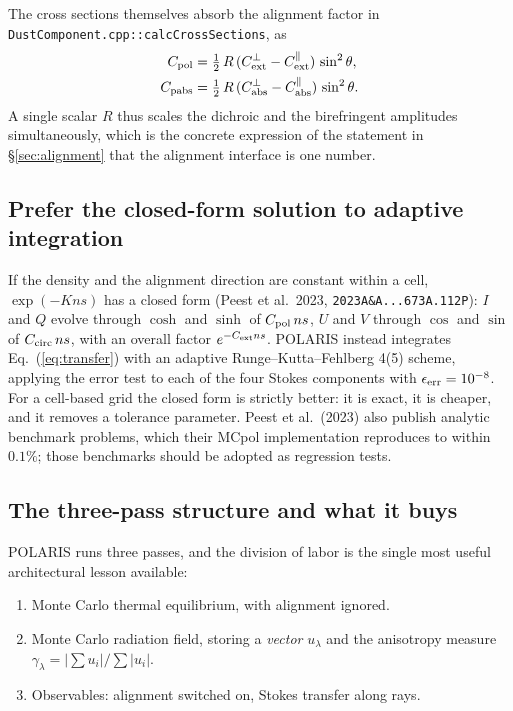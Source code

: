 \documentclass{my_memo}
\newcommand{\code}[1]{\texttt{#1}}
\newcommand{\Cext}{\ensuremath{C_{\rm ext}}}
\newcommand{\Cabs}{\ensuremath{C_{\rm abs}}}
\newcommand{\Cpol}{\ensuremath{C_{\rm pol}}}
\newcommand{\Ccirc}{\ensuremath{C_{\rm circ}}}
\begin{document}
The cross sections themselves absorb the alignment factor in
\code{DustComponent.cpp::calcCrossSections}, as
\begin{align}
  \Cpol  &= \tfrac12\,R\,(\Cext^{\perp} - \Cext^{\parallel})\,\sin^2\theta,
    \label{eq:cpolR} \\
  C_{\rm pabs} &= \tfrac12\,R\,(\Cabs^{\perp} - \Cabs^{\parallel})\,\sin^2\theta.
    \label{eq:cpabsR}
\end{align}
A single scalar $R$ thus scales the dichroic and the birefringent
amplitudes simultaneously, which is the concrete expression of the
statement in \S\ref{sec:alignment} that the alignment interface is one
number.

\subsection{Prefer the closed-form solution to adaptive integration}

If the density and the alignment direction are constant within a cell,
$\exp(-Kns)$ has a closed form (Peest et al.\ 2023,
\code{2023A\&A...673A.112P}): $I$ and $Q$ evolve through
$\cosh$ and $\sinh$ of $\Cpol\,n s$, $U$ and $V$ through $\cos$ and
$\sin$ of $\Ccirc\,n s$, with an overall factor $e^{-\Cext n s}$. POLARIS
instead integrates Eq.~(\ref{eq:transfer}) with an adaptive
Runge--Kutta--Fehlberg 4(5) scheme, applying the error test to each of
the four Stokes components with $\epsilon_{\rm err} = 10^{-8}$. For a
cell-based grid the closed form is strictly better: it is exact, it is
cheaper, and it removes a tolerance parameter. Peest et al.\ (2023) also
publish analytic benchmark problems, which their MCpol implementation
reproduces to within $0.1\%$; those benchmarks should be adopted as
regression tests.

\subsection{The three-pass structure and what it buys}

POLARIS runs three passes, and the division of labor is the single most
useful architectural lesson available:

\begin{enumerate}
\item Monte Carlo thermal equilibrium, with alignment ignored.
\item Monte Carlo radiation field, storing a \emph{vector}
      $u_\lambda$ and the anisotropy measure
      $\gamma_\lambda = |\sum u_i| / \sum|u_i|$.
\item Observables: alignment switched on, Stokes transfer along rays.
\end{enumerate}
\end{document}
